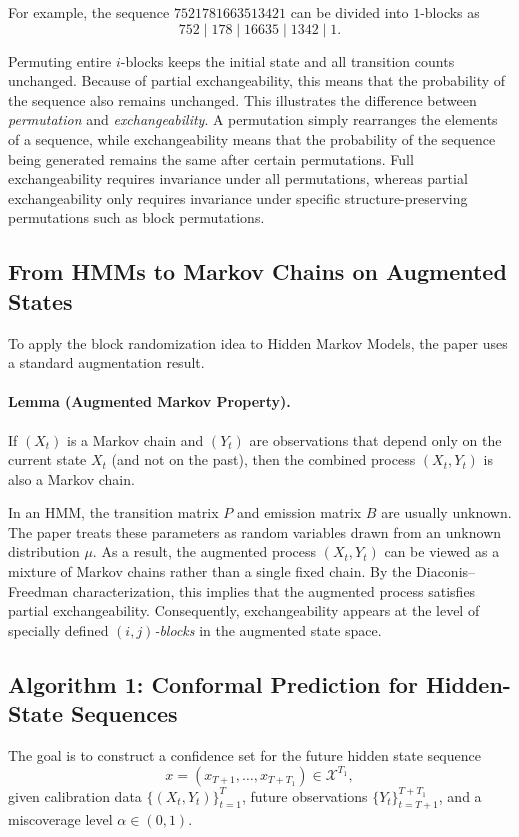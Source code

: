 \documentclass{article}
\begin{document}
For example, the sequence $7521781663513421$ can be divided into $1$-blocks as
\[
752 \mid 178 \mid 16635 \mid 1342 \mid 1.
\]

Permuting entire $i$-blocks keeps the initial state and all transition counts unchanged. Because of partial exchangeability, this means that the probability of the sequence also remains unchanged. This illustrates the difference between \emph{permutation} and \emph{exchangeability}. A permutation simply rearranges the elements of a sequence, while exchangeability means that the probability of the sequence being generated remains the same after certain permutations. Full exchangeability requires invariance under all permutations, whereas partial exchangeability only requires invariance under specific structure-preserving permutations such as block permutations.

\subsection{From HMMs to Markov Chains on Augmented States}

To apply the block randomization idea to Hidden Markov Models, the paper uses a standard augmentation result.

\paragraph{Lemma (Augmented Markov Property).}
If $(X_t)$ is a Markov chain and $(Y_t)$ are observations that depend only on the current state $X_t$ (and not on the past), then the combined process $(X_t,Y_t)$ is also a Markov chain.

In an HMM, the transition matrix $P$ and emission matrix $B$ are usually unknown. The paper treats these parameters as random variables drawn from an unknown distribution $\mu$. As a result, the augmented process $(X_t,Y_t)$ can be viewed as a mixture of Markov chains rather than a single fixed chain. By the Diaconis--Freedman characterization, this implies that the augmented process satisfies partial exchangeability. Consequently, exchangeability appears at the level of specially defined \emph{$(i,j)$-blocks} in the augmented state space.

\subsection{Algorithm 1: Conformal Prediction for Hidden-State Sequences}

The goal is to construct a confidence set for the future hidden state sequence
\[
x=(x_{T+1},\ldots,x_{T+T_1})\in\mathcal{X}^{T_1},
\]
given calibration data $\{(X_t,Y_t)\}_{t=1}^T$, future observations $\{Y_t\}_{t=T+1}^{T+T_1}$, and a miscoverage level $\alpha\in(0,1)$.
\end{document}
